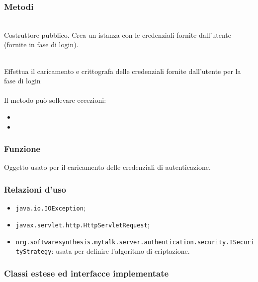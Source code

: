 \subsubsection*{Metodi}
\begin{description}
	\item{}\\
	Costruttore pubblico. Crea un istanza con le credenziali fornite dall'utente (fornite in fase di login).

	\item{}\\
	Effettua il caricamento e crittografa delle credenziali fornite dall'utente per la fase di login\\\\
	Il metodo può sollevare eccezioni:
	\begin{itemize}
		\item {}
		\item {}
	\end{itemize}

\end{description}


\subsubsection*{Funzione}
Oggetto usato per il caricamento delle credenziali di autenticazione.

\subsubsection*{Relazioni d'uso}
\begin{itemize}
	\item \texttt{java.io.IOException};
	\item \texttt{javax.servlet.http.HttpServletRequest};
	\item \texttt{org.softwaresynthesis.mytalk.server.authentication.security.ISecurityStrategy}: usata per definire l'algoritmo di criptazione.
\end{itemize}

\subsubsection*{Classi estese ed interfacce implementate}

